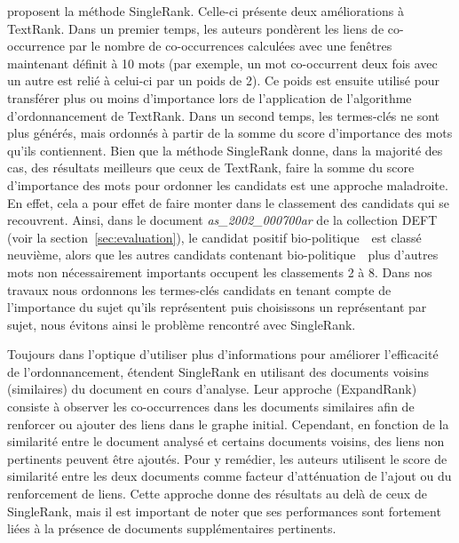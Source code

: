      proposent la méthode SingleRank. Celle-ci
    présente deux améliorations à TextRank. Dans un premier temps, les auteurs
    pondèrent les liens de co-occurrence par le nombre de co-occurrences
    calculées avec une fenêtres maintenant définit à 10 mots (par exemple, un
    mot co-occurrent deux fois avec un autre est relié à celui-ci par un poids
    de 2). Ce poids est ensuite utilisé pour transférer plus ou moins
    d'importance lors de l'application de l'algorithme d'ordonnancement de
    TextRank.
    Dans un second temps, les termes-clés ne sont plus générés, mais ordonnés à
    partir de la somme du score d'importance des mots qu'ils contiennent. Bien 
    que la méthode SingleRank donne, dans la majorité des cas, des résultats
    meilleurs que ceux de TextRank, faire la somme du score d'importance des
    mots pour ordonner les candidats est une approche maladroite. En effet, cela
    a pour effet de faire monter dans le classement des candidats qui se
    recouvrent. Ainsi, dans le document \textit{as\_2002\_000700ar} de la
    collection DEFT (voir la section~\ref{sec:evaluation}), le candidat positif
    \og bio-politique~\fg\ est classé neuvième, alors que les autres candidats
    contenant \og bio-politique~\fg\ plus d'autres mots non nécessairement
    importants occupent les classements 2 à 8. Dans nos travaux nous
    ordonnons les termes-clés candidats en tenant compte de l'importance du
    sujet qu'ils représentent puis choisissons un représentant par sujet, nous
    évitons ainsi le problème rencontré avec SingleRank.

    Toujours dans l'optique d'utiliser plus d'informations pour améliorer
    l'efficacité de l'ordonnancement,  étendent
    SingleRank en utilisant des documents voisins (similaires) du document en
    cours d'analyse. Leur approche (ExpandRank) consiste à observer les
    co-occurrences dans les documents similaires afin de renforcer ou ajouter
    des liens dans le graphe initial. Cependant, en fonction de la similarité
    entre le document analysé et certains documents voisins, des liens non
    pertinents peuvent être ajoutés. Pour y remédier, les auteurs utilisent le
    score de similarité entre les deux documents comme facteur d'atténuation de
    l'ajout ou du renforcement de liens. Cette approche donne des résultats au
    delà de ceux de SingleRank, mais il est important de noter que ses
    performances sont fortement liées à la présence de documents supplémentaires
    pertinents.

